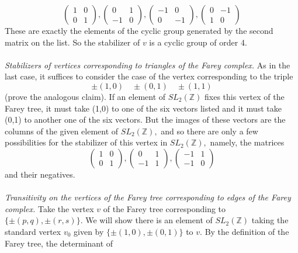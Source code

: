 \[
\left(\begin{array}{ll}
1 & 0 \\
0 & 1
\end{array}\right),\left(\begin{array}{rr}
0 & 1 \\
-1 & 0
\end{array}\right),\left(\begin{array}{rr}
-1 & 0 \\
0 & -1
\end{array}\right),\left(\begin{array}{rr}
0 & -1 \\
1 & 0
\end{array}\right)
\]
These are exactly the elements of the cyclic group generated by the second matrix on the list. So the stabilizer of $v$ is a cyclic group of order 4.
\\
\\
\noindent
\textit{Stabilizers of vertices corresponding to triangles of the Farey complex. }As in the
last case, it suffices to consider the case of the vertex corresponding to the triple
\[
\pm(1,0) \quad \pm(0,1) \quad \pm(1,1)
\]
(prove the analogous claim). If an element of $SL_2(\mathbb{Z})$ fixes this vertex of the Farey tree, it must take (1,0) to one of the six vectors listed and it must take (0,1) to another one of the six vectors. But the images of these vectors are the columns of the given element of $SL_2(\mathbb{Z}),$ and so there are only a few possibilities for the stabilizer of this vertex in $SL_2(\mathbb{Z}),$ namely, the matrices
\[
\left(\begin{array}{ll}
1 & 0 \\
0 & 1
\end{array}\right),\left(\begin{array}{rr}
0 & 1 \\
-1 & 1
\end{array}\right),\left(\begin{array}{ll}
-1 & 1 \\
-1 & 0
\end{array}\right)
\]
and their negatives.
\\
\\
\noindent
\textit{Transitivity on the vertices of the Farey tree corresponding to edges of the Farey complex.} Take the vertex $v$ of the Farey tree corresponding to $\{\pm(p, q), \pm(r, s)\} .$ We will show there is an element of $SL_2(\mathbb{Z})$ taking the standard vertex $v_{0}$ given by $\{\pm(1,0), \pm(0,1)\}$ to $v .$ By the definition of the Farey tree, the determinant of
